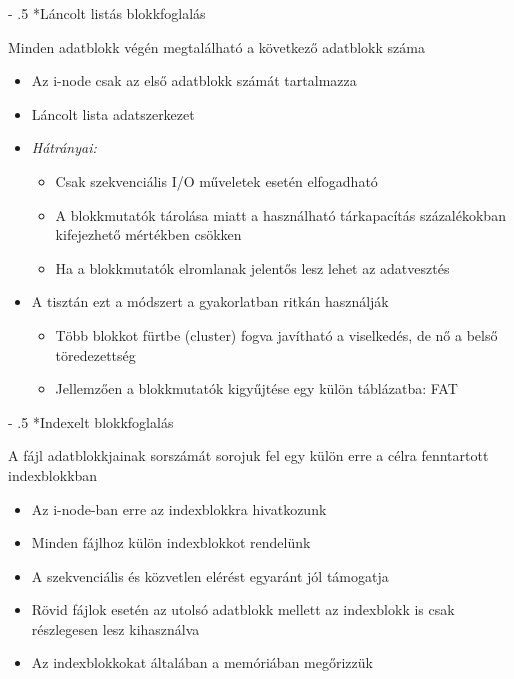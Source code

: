 \documentclass[tikz,12pt,margin=0px]{article}
\makeatletter
\renewcommand\paragraph{%
	\@startsection{paragraph}{4}{0mm}%
	{-\baselineskip}%
	{.5\baselineskip}%
	{\normalfont\normalsize\bfseries}}
\makeatother
\begin{document}
    \paragraph*{Láncolt listás blokkfoglalás}

    Minden adatblokk végén megtalálható a következő adatblokk száma
    \begin{itemize}[topsep=8pt,itemsep=4pt,partopsep=4pt, parsep=4pt]
      \item Az i-node csak az első adatblokk számát tartalmazza
      \item Láncolt lista adatszerkezet
      \item \emph{Hátrányai:}
      \begin{itemize}
        \item Csak szekvenciális I/O műveletek esetén elfogadható
        \item A blokkmutatók tárolása miatt a használható tárkapacítás százalékokban kifejezhető mértékben csökken
        \item Ha a blokkmutatók elromlanak jelentős lesz lehet az adatvesztés
      \end{itemize}
      \item A tisztán ezt a módszert a gyakorlatban ritkán használják
      \begin{itemize}
        \item Több blokkot fürtbe (cluster) fogva javítható a viselkedés, de nő a belső töredezettség
        \item Jellemzően a blokkmutatók kigyűjtése egy külön táblázatba: FAT
      \end{itemize}
    \end{itemize}

    \paragraph*{Indexelt blokkfoglalás}

    A fájl adatblokkjainak sorszámát sorojuk fel egy külön erre a célra fenntartott indexblokkban
    \begin{itemize}[topsep=8pt,itemsep=4pt,partopsep=4pt, parsep=4pt]
      \item Az i-node-ban erre az indexblokkra hivatkozunk
      \item Minden fájlhoz külön indexblokkot rendelünk
      \item A szekvenciális és közvetlen elérést egyaránt jól támogatja
      \item Rövid fájlok esetén az utolsó adatblokk mellett az indexblokk is csak részlegesen lesz kihasználva
      \item Az indexblokkokat általában a memóriában megőrizzük
    \end{itemize}
\end{document}
